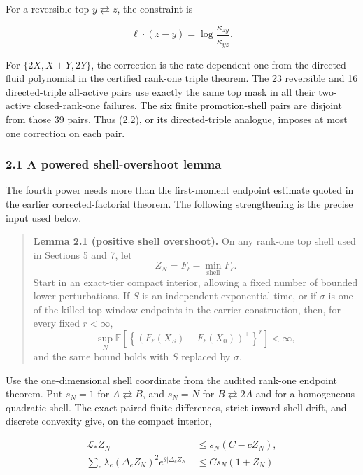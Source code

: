 For a reversible top \(y\rightleftarrows z\), the constraint is

\[
 \ell\mathbin\cdot(z-y)
   =\log\frac{\kappa_{zy}}{\kappa_{yz}}.             \tag{2.2}
\]

For \(\{2X,X+Y,2Y\}\), the correction is the rate-dependent one from the
directed fluid polynomial in the certified rank-one triple theorem. The
23 reversible and 16 directed-triple all-active pairs use exactly the
same top mask in all their two-active closed-rank-one failures. The six
finite promotion-shell pairs are disjoint from those 39 pairs. Thus
(2.2), or its directed-triple analogue, imposes at most one correction
on each pair.

\subsubsection{2.1 A powered shell-overshoot
lemma}

The fourth power needs more than the first-moment endpoint estimate
quoted in the earlier corrected-factorial theorem. The following
strengthening is the precise input used below.

\begin{quote}
\textbf{Lemma 2.1 (positive shell overshoot).} On any rank-one top shell
used in Sections 5 and 7, let \[
Z_N=F_\ell-\min_{\mathrm{shell}}F_\ell .           \tag{2.3}
\] Start in an exact-tier compact interior, allowing a fixed number of
bounded lower perturbations. If \(S\) is an independent exponential
time, or if \(\sigma\) is one of the killed top-window endpoints in the
carrier construction, then, for every fixed \(r<\infty\), \[
\sup_N\mathbb E
\left[\left\{(F_\ell(X_S)-F_\ell(X_0))^+\right\}^r\right]<\infty,
\tag{2.4}
\] and the same bound holds with \(S\) replaced by \(\sigma\).
\end{quote}

Use the one-dimensional shell coordinate from the audited rank-one
endpoint theorem. Put \(s_N=1\) for \(A\rightleftarrows B\), and
\(s_N=N\) for \(B\rightleftarrows2A\) and for a homogeneous quadratic
shell. The exact paired finite differences, strict inward shell drift,
and discrete convexity give, on the compact interior,

\[
\begin{split}
 \mathcal L_*Z_N&\le s_N(C-cZ_N),\\
 \sum_e\lambda_e(\Delta_eZ_N)^2
       e^{\theta|\Delta_eZ_N|}&\le Cs_N(1+Z_N)
\end{split}                                          \tag{2.5}
\]

